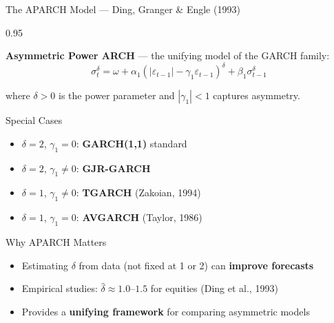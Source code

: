 \documentclass[9pt, aspectratio=169, t]{beamer}
\begin{document}
\begin{frame}{The APARCH Model --- Ding, Granger \& Engle (1993)}
    \begin{cminipage}{0.95\textwidth}
        \vspace{-0.3cm}
    {\footnotesize
        \begin{defn}[APARCH(1,1)]
            \textbf{Asymmetric Power ARCH} --- the unifying model of the GARCH family:
            \vspace{-2mm}
            \[
                \sigma_t^\delta = \omega + \alpha_1 (|\varepsilon_{t-1}| - \gamma_1 \varepsilon_{t-1})^\delta + \beta_1 \sigma_{t-1}^\delta
            \]
            \vspace{-2mm}

            where $\delta > 0$ is the power parameter and $|\gamma_1| < 1$ captures asymmetry.
        \end{defn}
        \vspace{-1mm}
        \begin{block}{Special Cases}
            \begin{itemize}\setlength{\itemsep}{0pt}
                \item $\delta = 2$, $\gamma_1 = 0$: \textbf{GARCH(1,1)} standard
                \item $\delta = 2$, $\gamma_1 \neq 0$: \textbf{GJR-GARCH}
                \item $\delta = 1$, $\gamma_1 \neq 0$: \textbf{TGARCH} (Zakoian, 1994)
                \item $\delta = 1$, $\gamma_1 = 0$: \textbf{AVGARCH} (Taylor, 1986)
            \end{itemize}
        \end{block}
        \vspace{-1mm}
        \begin{alertblock}{Why APARCH Matters}
            \begin{itemize}\setlength{\itemsep}{0pt}
                \item Estimating $\delta$ from data (not fixed at 1 or 2) can \textbf{improve forecasts}
                \item Empirical studies: $\hat{\delta} \approx 1.0$--$1.5$ for equities (Ding et al., 1993)
                \item Provides a \textbf{unifying framework} for comparing asymmetric models
            \end{itemize}
        \end{alertblock}
    }
    \end{cminipage}
\end{frame}
\end{document}
